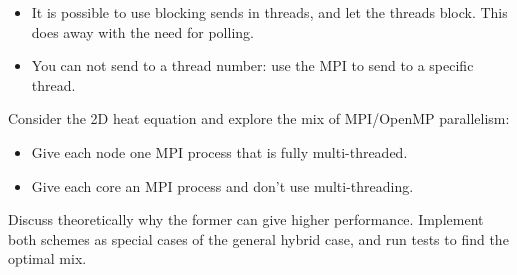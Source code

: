 \begin{itemize}
\item It is possible to use blocking sends in threads, and let the
  threads block. This does away with the need for polling.
\item You can not send to a thread number: use the MPI
   to send to a specific thread.
\end{itemize}

\begin{exercise}
Consider the 2D heat equation and explore the mix of MPI/OpenMP
parallelism:
\begin{itemize}
\item Give each node one MPI process that is fully multi-threaded.
\item Give each core an MPI process and don't use multi-threading.
\end{itemize}
Discuss theoretically why the former can give higher performance.
Implement both schemes as special cases of the general hybrid case,
and run tests to find the optimal mix.
\end{exercise}


